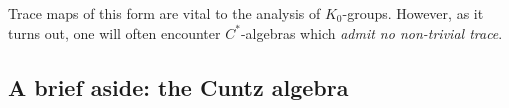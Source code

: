 \documentclass[aps,pra,showpacs,notitlepage,onecolumn,superscriptaddress,nofootinbib]{revtex4-1}
\newcommand{\hhrulefill}{\hspace{-1.0em}\hrulefill}
\theoremstyle{definition}
\newtheorem{definition}{Definition}[section]
\newtheorem{theorem}{Theorem}[section]
\begin{document}
\noindent Trace maps of this form are vital to the analysis of $K_0$-groups. However, as it turns out, one will often encounter $C^{*}$-algebras which \emph{admit no non-trivial trace}.

\subsection{A brief aside: the Cuntz algebra}



\begin{comment}
\begin{theorem}[Atiyah-Singer index theorem]
  For an elliptic differential operator on a compact manifold, the analytical index is equal to the topological index.
\end{theorem}

\hhrulefill

\section{Building up to the index theorem}

\noindent The main goal of this section of the essay is to develop the necessary machinery in order to understand each individual concept utilized in the statement of the index
theorem. At a coarse-grained level, this will involve defining \emph{elliptic differential operators}, \emph{analytical index}, and \emph{topological index}. The first of these concepts
is simple.

\begin{definition}[Elliptic differential operator]
  We let $D$ be an order-$m$ differential operator on domain $\Omega \subset \mathbb{R}^{n}$, given by $Du = \sum_{|a| \leq m} f_{\alpha}(x) \partial^{\alpha} u$, where $u \in C^{\infty}(\Omega, \mathbb{R})$,
  where $\alpha = (\alpha_1, \dots, \alpha_n)$ with $\alpha_1 + \cdots + \alpha_n = m$ and $\partial^{\alpha} = \partial_1^{\alpha_1} \cdots \partial_{n}^{\alpha_n}$. The operator $D$ is said to be \emph{elliptic}
  if for every $x \in \Omega$ and non-zero $y \in \mathbb{R}$,
  \begin{equation}
    \displaystyle\sum_{\alpha = |m|} f_{\alpha}(x) y^{\alpha_1} \cdots y^{\alpha_n} \neq 0.
    \end{equation}
\end{definition}

\noindent As for the two notions of ``index'': these ideas are much more subtle and require substantial exposition.
\end{comment}
\end{document}
